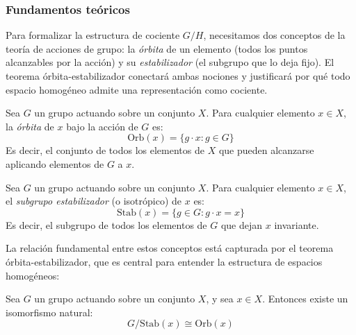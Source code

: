 \subsubsection{Fundamentos teóricos}

Para formalizar la estructura de cociente $G/H$, necesitamos dos conceptos de la teoría de acciones de grupo: la \textit{órbita} de un elemento (todos los puntos alcanzables por la acción) y su \textit{estabilizador} (el subgrupo que lo deja fijo). El teorema órbita-estabilizador conectará ambas nociones y justificará por qué todo espacio homogéneo admite una representación como cociente.

\begin{definition}[Órbita]\label{def:orbita}
Sea $G$ un grupo actuando sobre un conjunto $X$. Para cualquier elemento $x \in X$, la \textit{órbita} de $x$ bajo la acción de $G$ es:
\begin{equation}
\text{Orb}(x) = \{g \cdot x : g \in G\}
\end{equation}
Es decir, el conjunto de todos los elementos de $X$ que pueden alcanzarse aplicando elementos de $G$ a $x$.
\end{definition}

\begin{definition}\label{def:estabilizador}
Sea $G$ un grupo actuando sobre un conjunto $X$. Para cualquier elemento $x \in X$, el \textit{subgrupo estabilizador} (o isotrópico) de $x$ es:
\begin{equation}
\text{Stab}(x) = \{g \in G : g \cdot x = x\}
\end{equation}
Es decir, el subgrupo de todos los elementos de $G$ que dejan $x$ invariante.
\end{definition}

La relación fundamental entre estos conceptos está capturada por el teorema órbita-estabilizador, que es central para entender la estructura de espacios homogéneos:

\begin{theorem}\label{thm:orbita_estabilizador}
Sea $G$ un grupo actuando sobre un conjunto $X$, y sea $x \in X$. Entonces existe un isomorfismo natural:
\begin{equation}
G/\text{Stab}(x) \cong \text{Orb}(x)
\end{equation}
\end{theorem}

